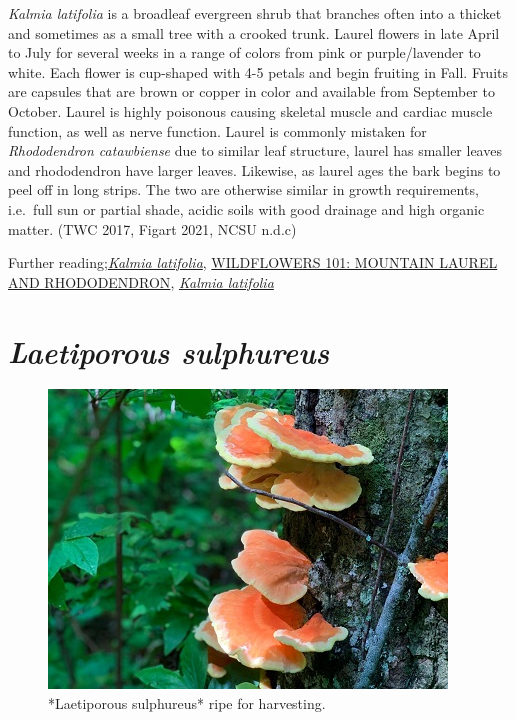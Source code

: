 \documentclass[
]{article}
\begin{document}
\emph{Kalmia latifolia} is a broadleaf evergreen shrub that branches often into a thicket and sometimes as a small tree with a crooked trunk. Laurel flowers in late April to July for several weeks in a range of colors from pink or purple/lavender to white. Each flower is cup-shaped with 4-5 petals and begin fruiting in Fall. Fruits are capsules that are brown or copper in color and available from September to October. Laurel is highly poisonous causing skeletal muscle and cardiac muscle function, as well as nerve function. Laurel is commonly mistaken for \emph{Rhododendron catawbiense} due to similar leaf structure, laurel has smaller leaves and rhododendron have larger leaves. Likewise, as laurel ages the bark begins to peel off in long strips. The two are otherwise similar in growth requirements, i.e.~full sun or partial shade, acidic soils with good drainage and high organic matter. (TWC 2017, Figart 2021, NCSU n.d.c)

Further reading;\href{https://www.wildflower.org/plants/result.php?id_plant=KALA}{\emph{Kalmia latifolia}}, \href{https://www.smokiesinformation.org/news/wildflowers-101-mountain-laurel-and-rhododendron.html\#:~:text=The\%20laurel\%20has\%20the\%20smaller,leaves\%20droop\%20and\%20curl\%20back.}{WILDFLOWERS 101: MOUNTAIN LAUREL AND RHODODENDRON}, \href{https://plants.ces.ncsu.edu/plants/kalmia-latifolia/}{\emph{Kalmia latifolia}}

\hypertarget{laetiporous-sulphureus}{%
\section{\texorpdfstring{\emph{Laetiporous sulphureus}}{Laetiporous sulphureus}}\label{laetiporous-sulphureus}}

\begin{figure}

{\centering \includegraphics[width=0.5\linewidth]{chicken} 

}

\caption{*Laetiporous sulphureus* ripe for harvesting.}\label{fig:chicken}
\end{figure}
\end{document}
